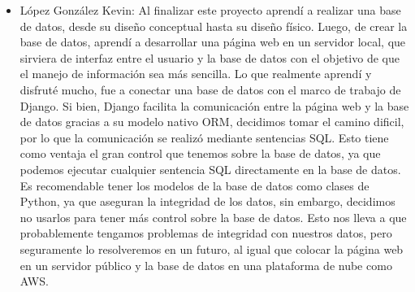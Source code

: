 \documentclass[12pt,letterpaper]{article}
\begin{document}
\begin{itemize}
		
		
		\item López González Kevin:
		\subitem Al finalizar este proyecto aprendí a realizar una base de datos, desde su diseño conceptual hasta su diseño físico. Luego, de crear la base de datos, aprendí a desarrollar una página web en un servidor local, que sirviera de interfaz entre el usuario y la base de datos con el objetivo de que el manejo de información sea más sencilla.
		Lo que realmente aprendí y disfruté mucho, fue a conectar una base de datos con el marco de trabajo de Django. Si bien, Django facilita la comunicación entre la página web y la base de datos gracias a su modelo nativo ORM, decidimos tomar el camino dificil, por lo que la comunicación se realizó mediante sentencias SQL. Esto tiene como ventaja el gran control que tenemos sobre la base de datos, ya que podemos ejecutar cualquier sentencia SQL directamente en la base de datos. Es recomendable tener los modelos de la base de datos como clases de Python, ya que aseguran la integridad de los datos, sin embargo, decidimos no usarlos para tener más control sobre la base de datos. Esto nos lleva a que probablemente tengamos problemas de integridad con nuestros datos, pero seguramente lo resolveremos en un futuro, al igual que colocar la página web en un servidor público y la base de datos en una plataforma de nube como AWS.
		

\end{itemize}
\end{document}
